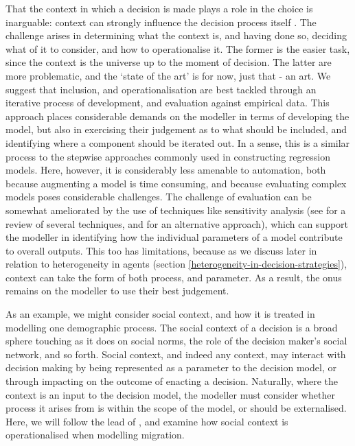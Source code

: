 \documentclass{article}
\begin{document}
That the context in which a decision is made plays a role in the choice is inarguable: context can strongly influence the decision process itself \citep{Ben-Akiva2012}. The challenge arises in determining what the context is, and having done so, deciding what of it to consider, and how to operationalise it. The former is the easier task, since the context is the universe up to the moment of decision. The latter are more problematic, and the `state of the art' is for now, just that - an art. We suggest that inclusion, and operationalisation are best tackled through an iterative process of development, and evaluation against empirical data. This approach places considerable demands on the modeller in terms of developing the model, but also in exercising their judgement as to what should be included, and identifying where a component should be iterated out. In a sense, this is a similar process to the stepwise approaches commonly used in constructing regression models. Here, however, it is considerably less amenable to automation, both because augmenting a model is time consuming, and because evaluating complex models poses considerable challenges. The challenge of evaluation can be somewhat ameliorated by the use of techniques like sensitivity analysis (see \citet{Thiele2014} for a review of several techniques, and \citet{Oakley2004} for an alternative approach), which can support the modeller in identifying how the individual parameters of a model contribute to overall outputs. This too has limitations, because as we discuss later in relation to heterogeneity in agents (section \ref{heterogeneity-in-decision-strategies}), context can take the form of both process, and parameter.
As a result, the onus remains on the modeller to use their best judgement.

As an example, we might consider social context, and how it is treated in modelling one demographic process. The social context of a decision is a broad sphere touching as it does on social norms, the role of the decision maker's social network, and so forth. Social context, and indeed any context, may interact with decision making by being represented as a parameter to the decision model, or through impacting on the outcome of enacting a decision. Naturally, where the context is an input to the decision model, the modeller must consider whether process it arises from is within the scope of the model, or should be externalised.
Here, we will follow the lead of \citet{Klabunde}, and examine how social context is operationalised when modelling migration. 
\end{document}

